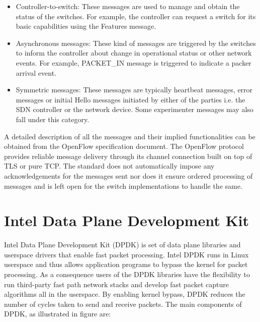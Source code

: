 \begin{itemize}
	\item Controller-to-switch: These messages are used to manage and obtain the status of the switches. For example, the controller can request a switch for its basic capabilities using the Features message.\\
	\item Asynchronous messages: These kind of messages are triggered by the switches to inform the controller about change in operational status or other network events. For example, PACKET\_IN message is triggered to indicate a packer arrival event.\\
	\item Symmetric messages: These messages are typically heartbeat messages, error messages or initial Hello messages initiated by either of the parties i.e. the SDN controller or the network device. Some experimenter messages may also fall under this category.
\end{itemize}A detailed description of all the messages and their implied functionalities can be obtained from the OpenFlow specification document\cite{OFSwitchSpecification}. The OpenFlow protocol provides reliable message delivery through its channel connection built on top of TLS or pure TCP. The standard does not automatically impose any acknowledgements for the messages sent nor does it ensure ordered processing of messages and is left open for the switch implementations to handle the same.



\section{Intel Data Plane Development Kit}
Intel Data Plane Development Kit (DPDK) \cite{DPDK} is set of data plane libraries and userspace drivers that enable fast packet processing. Intel DPDK runs in Linux userspace and thus allows application programs to bypass the kernel for packet processing. As a consequence users of the DPDK libraries have the flexibility to run third-party fast path network stacks and develop fast packet capture algorithms all in the userspace. By enabling kernel bypass, DPDK reduces the number of cycles taken to send and receive packets. The main components of DPDK, as illustrated in figure  are:


